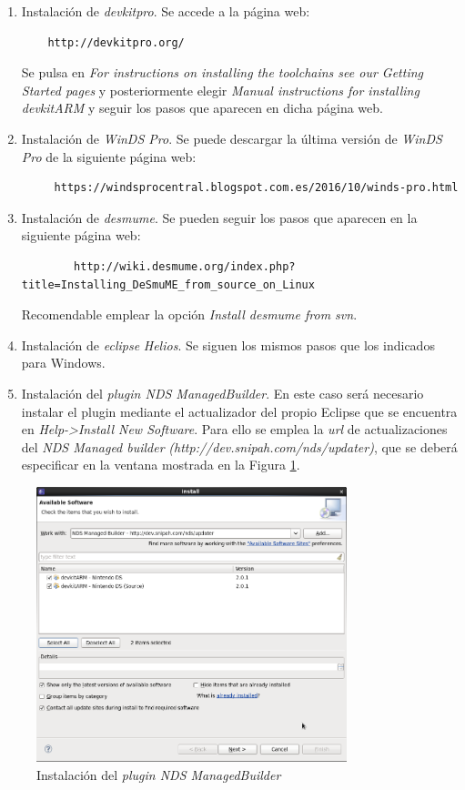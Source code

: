 \begin{enumerate}
\item Instalación de \textit{devkitpro}. Se accede a la página web:
 	\begin{verbatim}
 	http://devkitpro.org/
 	\end{verbatim}
Se pulsa en \textit{For instructions on installing the toolchains see our Getting Started pages} y posteriormente elegir \textit{Manual instructions for installing devkitARM} y seguir los pasos que aparecen en dicha página web.
%	
\item Instalación de \textit{WinDS Pro}. Se puede descargar la última versión de \textit{WinDS Pro} de la siguiente página web:
	\begin{verbatim}
	 https://windsprocentral.blogspot.com.es/2016/10/winds-pro.html
	\end{verbatim} 
%
\item Instalación de \textit{desmume}. Se pueden seguir los pasos que aparecen en la siguiente página web:
{\scriptsize
	\begin{verbatim}
		http://wiki.desmume.org/index.php?title=Installing_DeSmuME_from_source_on_Linux
	\end{verbatim}
}

Recomendable emplear la opción \textit{Install desmume from svn}.
%
\item Instalación de \textit{eclipse} \textit{Helios}. Se siguen los mismos pasos que los indicados para Windows.
%
\item Instalación del \textit{plugin NDS ManagedBuilder}. En este caso será necesario  instalar el plugin mediante el actualizador del propio Eclipse que se encuentra en \textit{Help->Install New Software}. Para ello se emplea la \textit{url} de actualizaciones del \textit{NDS Managed builder}
 \textit{(http://dev.snipah.com/nds/updater)}, que se deberá especificar en la ventana mostrada en la Figura \ref{fig_c2_managebuilder}.
\end{enumerate}

\begin{figure}[t]
	\centering
	\includegraphics[height=8cm]{./Figuras/C2/c2_Pantallazo2.png}
	\caption{Instalación del \textit{plugin NDS ManagedBuilder}}
	\label{fig_c2_managebuilder}
\end{figure}


